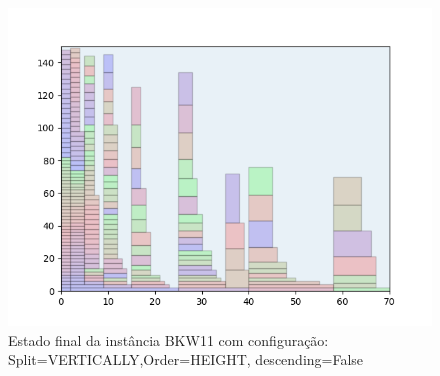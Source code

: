 \begin{figure}[H]
    \centering
    \caption[]{Estado final da instância BKW11 com configuração: Split=VERTICALLY,Order=HEIGHT, descending=False}
    \label{fig:bkw11-vertically-height-false}
    \includegraphics[scale=0.5]{output/figures/bkw/bkw11/vertically/height/false/000}
\end{figure}